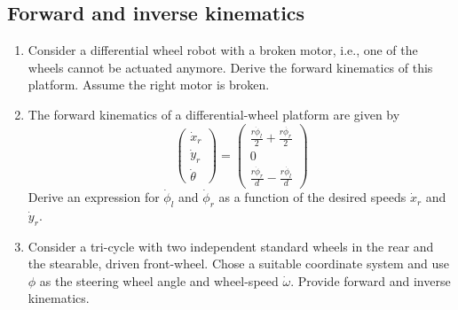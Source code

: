 \subsection*{Forward and inverse kinematics}
\begin{enumerate}
\item Consider a differential wheel robot with a broken motor, i.e., one of the wheels cannot be actuated anymore. Derive the forward kinematics of this platform. Assume the right motor is broken.
\item The forward kinematics of a differential-wheel platform are given by 
\begin{equation}
\nonumber
\left(\begin{array}{c}
\dot{x}_r\\
\dot{y}_r\\
\dot{\theta}
\end{array}\right)
=
\left(\begin{array}{c}
\frac{r\dot{\phi}_l}{2}+\frac{r\dot{\phi_r}}{2}\\
0\\
\frac{r\dot{\phi}_r}{d}-\frac{r\dot{\phi_l}}{d}
\end{array}\right)
\end{equation}
Derive an expression for $\dot{\phi}_l$ and $\dot{\phi}_r$ as a function of the desired speeds $\dot{x}_r$ and $\dot{y}_r$. 
\item Consider a tri-cycle with two independent standard wheels in the rear and the stearable, driven front-wheel. Chose a suitable coordinate system and use $\phi$ as the steering wheel angle and wheel-speed $\dot{\omega}$. Provide forward and inverse kinematics. 
\end{enumerate}
\normalsize